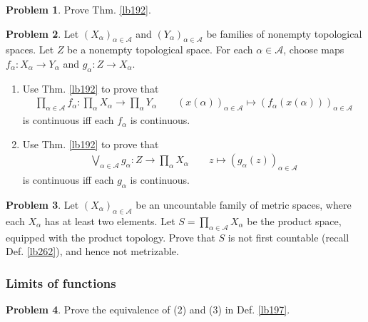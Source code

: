 \documentclass[12pt,b5paper,notitlepage]{article}
\theoremstyle{definition}
\newtheorem{prob}{\color{red}Problem}[section]
\theoremstyle{plain}
\newcommand{\scr}{\mathscr}
\numberwithin{equation}{section}
\begin{document}
\begin{prob}
Prove Thm. \ref{lb192}.
\end{prob}


\begin{prob}\label{lb258}
Let $(X_\alpha)_{\alpha\in\scr A}$ and $(Y_\alpha)_{\alpha\in\scr A}$ be families of nonempty topological spaces. Let $Z$ be a nonempty topological space. For each $\alpha\in\scr A$, choose maps $f_\alpha:X_\alpha\rightarrow Y_\alpha$ and $g_\alpha:Z\rightarrow X_\alpha$. 
\begin{enumerate}
\item Use Thm. \ref{lb192} to prove that  \index{zz@$\prod_{\alpha\in\scr A} f_\alpha$}
\begin{align}
\prod_{\alpha\in\scr A}f_\alpha:\prod_\alpha X_\alpha\rightarrow\prod_\alpha Y_\alpha\qquad (x(\alpha))_{\alpha\in\scr A}\mapsto (f_\alpha(x(\alpha)))_{\alpha\in\scr A}
\end{align}
is continuous iff each $f_\alpha$ is continuous.
\item Use Thm. \ref{lb192} to prove that \index{zz@$\bigvee_{\alpha\in\scr A} f_\alpha$}
\begin{align}
\bigvee_{\alpha\in\scr A}g_\alpha:Z\rightarrow \prod_\alpha X_\alpha \qquad z\mapsto (g_\alpha(z))_{\alpha\in\scr A}
\end{align}
is continuous iff each $g_\alpha$ is continuous.
\end{enumerate}
\end{prob}







\begin{prob}\label{lb203}
Let $(X_\alpha)_{\alpha\in\scr A}$ be an uncountable family of metric spaces, where each $X_\alpha$ has at least two elements. Let $S=\prod_{\alpha\in\scr A}X_\alpha$ be the product space, equipped with the product topology. Prove that $S$ is not first countable (recall Def. \ref{lb262}), and hence not metrizable.
\end{prob}

\subsubsection{Limits of functions}

\begin{prob}
Prove the equivalence of (2) and (3) in Def. \ref{lb197}.
\end{prob}
\end{document}
